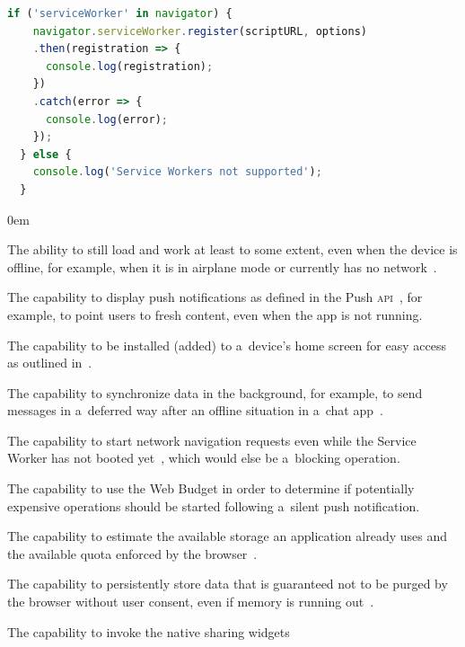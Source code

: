 \documentclass[sigconf]{acmart}
\begin{document}
\begin{lstlisting}[caption={Checking for Service Worker support.},
  label=code:sw-supported, language=JavaScript, float=htb] 
  if ('serviceWorker' in navigator) { 
    navigator.serviceWorker.register(scriptURL, options)
    .then(registration => {
      console.log(registration);
    })
    .catch(error => {
      console.log(error);
    });
  } else {
    console.log('Service Workers not supported');
  }
\end{lstlisting}

\begin{description}
  \itemsep0em 
  \item[Offline Capabilities] The ability to still load and work
    at least to some extent, even when the device is offline, for example,
    when it is in airplane mode or currently has no network~\cite{russell2017serviceworkers}.
  \item[Push Notifications] The capability to display push notifications as defined in
    the Push \textsc{api}~\cite{beverloo2017pushapi}, for example,
    to point users to fresh content, even when the app is not running.
  \item[Add to Home Screen] The capability to be installed (added) to a~device's home screen
    for easy access as outlined in~\cite{kinlan2017a2hs}.
  \item[Background Sync] The capability to synchronize data in the background,
    for example, to send messages in a~deferred way
    after an offline situation in a~chat app~\cite{russell2017serviceworkers}.
  \item[Navigation Preload] The capability to start network navigation requests
    even while the Service Worker has not booted yet~\cite{archibald2017navigationpreload},
    which would else be a~blocking operation.
  \item[Silent Push] The capability to use the Web Budget \cite{beverloo2017budgetapi}
    in order to determine if potentially expensive operations should be started
    following a~silent push notification.
  \item[Storage Estimation] The capability to estimate the available storage
    an application already uses and the available quota enforced by the
    browser~\cite{vankesteren2018storage}.
  \item[Persistent Storage] The capability to persistently store data
    that is guaranteed not to be purged by the browser without user consent,
    even if memory is running out~\cite{vankesteren2018storage}.
  \item[Web Share] The capability to invoke the native sharing widgets

\end{description}
\end{document}
